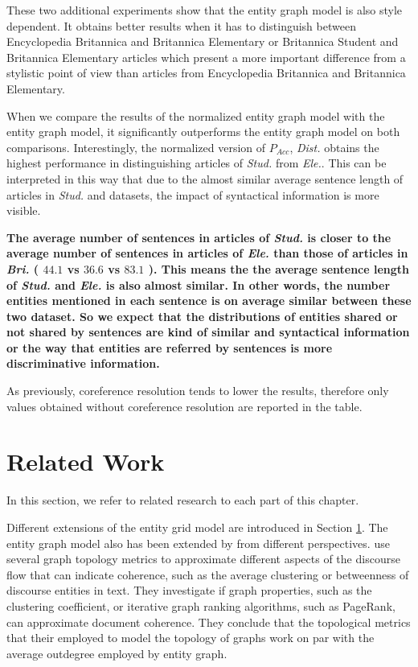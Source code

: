 These two additional experiments show that the entity graph model is also style dependent. 
It obtains better results when it has to distinguish between Encyclopedia Britannica and Britannica Elementary or Britannica Student and Britannica Elementary articles which present a more important difference from
a stylistic point of view than articles from Encyclopedia Britannica and Britannica Elementary.

When we compare the results of the normalized entity graph model with the entity graph model, it significantly outperforms the entity graph model on both comparisons. 
Interestingly, the normalized version of $P_{Acc}$, \textit{Dist.} obtains the highest performance in distinguishing articles of \textit{Stud.} from \textit{Ele.}. 
This can be interpreted in this way that due to the almost similar average sentence length of articles in \textit{Stud.} and  datasets, the impact of syntactical information is more visible. 

\textbf{
The average number of sentences in articles of \textit{Stud.} is closer to the average number of sentences in articles of \textit{Ele.} than those of articles in \textit{Bri.} 
( $44.1$ vs $36.6$ vs $83.1$ ). 
This means the the average sentence length of \textit{Stud.} and \textit{Ele.} is also almost similar. 
In other words, the number entities mentioned in each sentence is on average similar between these two dataset. 
So we expect that the distributions of entities shared or not shared by sentences are kind of similar and syntactical information or the way that entities are referred by sentences is more discriminative information. 
}


As previously, coreference resolution tends to lower the results, therefore only values obtained without coreference resolution are reported in the table.

\section{Related Work}
%
In this section, we refer to related research to each part of this chapter. 

Different extensions of the entity grid model are introduced in Section \ref{}. 
The entity graph model also has been extended by from different perspectives. 
\cite{petersen15} use several graph topology metrics to approximate different aspects of the discourse flow that can indicate coherence, such as the average clustering or betweenness of discourse entities in text. 
They investigate if graph properties, such as the clustering coefficient, or iterative graph ranking algorithms, such as PageRank,  can approximate document coherence. 
They conclude that the topological metrics that their employed to model the topology of graphs work on par with the average outdegree employed by  entity graph. 

